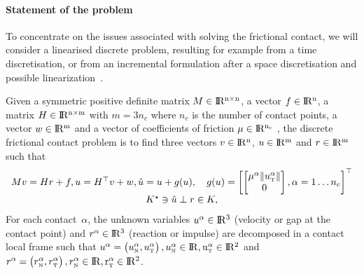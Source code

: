 \documentclass[10pt]{icccm2025}
\newcommand{\RR}{\ensuremath{\rm I\!R}}
\def\n{{\hbox{\tiny{N}}}}
\def\t{{\hbox{\tiny{T}}}}
\begin{document}
\vspace{-0.5cm}
\paragraph{Statement of the problem} To concentrate on the issues associated with solving the frictional contact, we will consider a linearised discrete problem, resulting for example from a time discretisation, or from an incremental formulation after a space discretisation and possible linearization~\cite{Acary.Cadoux2013}.




Given a symmetric positive definite matrix ${M} \in \RR^{n \times n}$, a vector $ {f} \in \RR^n$, a matrix  ${H} \in \RR^{n \times m}$ with $m= 3n_c$ where $n_c$ is the number of contact points, a vector $w \in \RR^{m}$ and a vector of coefficients of friction $\mu \in \RR^{n_c}$ , the discrete frictional contact problem is to find three vectors $ {v} \in \RR^n$, $u\in\RR^m$ and $r\in \RR^m$ such that
\begin{equation}\label{eq:soccp1}
  \begin{array}{c}
    M v = {H} {r} + {f}, 
    u = H^\top v + w,  
                         \hat u = u + g(u), \quad
    g(u) = \left[
\begin{bmatrix}
\mu^\alpha  \|u^\alpha_\t\| \\ 0
\end{bmatrix}
, \alpha = 1\ldots n_c\right]^\top \\[1ex]
                        K^\star \ni {\hat u} \perp r \in K,
  \end{array}
\end{equation}
For each contact~$\alpha$, the unknown variables  $u^\alpha\in\RR^3$ (velocity or gap at the contact point) and $r^\alpha\in\RR^3$ (reaction or impulse) are decomposed  in a contact local frame  such that $u^\alpha =
\begin{pmatrix}
  u^\alpha_{\n}, u^\alpha_{\t}
\end{pmatrix},
u^\alpha_{\n} \in \RR, u^\alpha_{\t} \in \RR^2$ and  $r^\alpha = \begin{pmatrix}
  r^\alpha_{\n}, r^\alpha_{\t}
\end{pmatrix}, r^\alpha_{\n} \in \RR, r^\alpha_{\t} \in \RR^2$.
\end{document}
